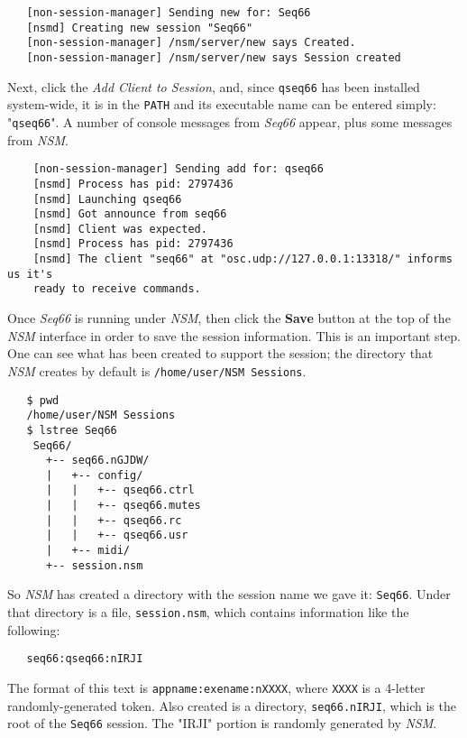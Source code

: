 \begin{verbatim}
   [non-session-manager] Sending new for: Seq66
   [nsmd] Creating new session "Seq66"
   [non-session-manager] /nsm/server/new says Created.
   [non-session-manager] /nsm/server/new says Session created
\end{verbatim}

   Next, click the \textsl{Add Client to Session}, and, since
   \texttt{qseq66} has been installed system-wide, it is in the \texttt{PATH}
   and its executable name can be entered simply: "\texttt{qseq66}".
   A number of console messages from
   \textsl{Seq66} appear, plus some messages from \textsl{NSM}.

\begin{verbatim}
	[non-session-manager] Sending add for: qseq66
	[nsmd] Process has pid: 2797436
	[nsmd] Launching qseq66
	[nsmd] Got announce from seq66
	[nsmd] Client was expected.
	[nsmd] Process has pid: 2797436
	[nsmd] The client "seq66" at "osc.udp://127.0.0.1:13318/" informs us it's
    ready to receive commands.
\end{verbatim}

	Once \textsl{Seq66} is running under \textsl{NSM},
   then click the \textbf{Save}
   button at the top of the \textsl{NSM} interface in order
   to save the session information.  This is an important step.
   One can see what has been created to support the session;
   the directory that \textsl{NSM}
   creates by default is \texttt{/home/user/NSM Sessions}.

\begin{verbatim}
   $ pwd
   /home/user/NSM Sessions
   $ lstree Seq66
	Seq66/
	  +-- seq66.nGJDW/
	  |   +-- config/
	  |   |   +-- qseq66.ctrl
	  |   |   +-- qseq66.mutes
	  |   |   +-- qseq66.rc
	  |   |   +-- qseq66.usr
	  |   +-- midi/
	  +-- session.nsm
\end{verbatim}

	So \textsl{NSM} has created a directory with the session name we gave it:
   \texttt{Seq66}.  Under that directory is a file, \texttt{session.nsm}, which
   contains information like the following:

\begin{verbatim}
   seq66:qseq66:nIRJI
\end{verbatim}

   The format of this text is \texttt{appname:exename:nXXXX}, where
   \texttt{XXXX} is a 4-letter randomly-generated token.
   Also created is a directory, \texttt{seq66.nIRJI}, which is the root of the
   \texttt{Seq66} session.  The "IRJI" portion is randomly generated by
   \textsl{NSM}.

